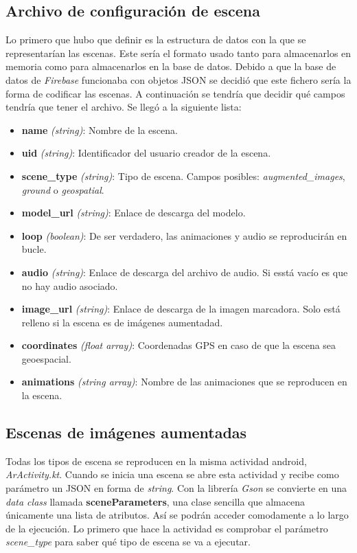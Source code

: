 
\subsection{Archivo de configuración de escena}

Lo primero que hubo que definir es la estructura de datos con la que se representarían las escenas. Este sería el formato usado tanto para almacenarlos en memoria como para almacenarlos en la base de datos. Debido a que la base de datos de \textit{Firebase} funcionaba con objetos JSON se decidió que este fichero sería la forma de codificar las escenas. A continuación se tendría que decidir qué campos tendría que tener el archivo. Se llegó a la siguiente lista:

\begin{itemize}
    \item \textbf{name} \textit{(string)}: Nombre de la escena.
    \item \textbf{uid} \textit{(string)}: Identificador del usuario creador de la escena.
    \item \textbf{scene\_type} \textit{(string)}: Tipo de escena. Campos posibles: \textit{augmented\_images}, \textit{ground} o \textit{geospatial}.
    \item \textbf{model\_url} \textit{(string)}: Enlace de descarga del modelo.
    \item \textbf{loop} \textit{(boolean)}: De ser verdadero, las animaciones y audio se reproducirán en bucle.
    \item \textbf{audio} \textit{(string)}: Enlace de descarga del archivo de audio. Si esstá vacío es que no hay audio asociado.
    \item \textbf{image\_url} \textit{(string)}: Enlace de descarga de la imagen marcadora. Solo está relleno si la escena es de imágenes aumentadad.
    \item \textbf{coordinates} \textit{(float array)}: Coordenadas GPS en caso de que la escena sea geoespacial.
    \item \textbf{animations} \textit{(string array)}: Nombre de las animaciones que se reproducen en la escena.
\end{itemize}

\subsection{Escenas de imágenes aumentadas}

Todas los tipos de escena se reproducen en la misma actividad android, \textit{ArActivity.kt}. Cuando se inicia una escena se abre esta actividad y recibe como parámetro un JSON en forma de \textit{string}. Con la librería \textit{Gson}\cite{gson} se convierte en una \textit{data class} llamada \textbf{sceneParameters}, una clase sencilla que almacena únicamente una lista de atributos. Así se podrán acceder comodamente a lo largo de la ejecución. Lo primero que hace la actividad es comprobar el parámetro \textit{scene\_type} para saber qué tipo de escena se va a ejecutar.

